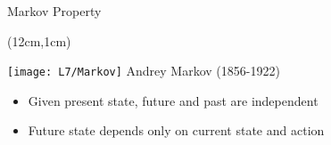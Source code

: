 \documentclass[11pt,aspectratio=169]{beamer}
\begin{document}
  
  \begin{frame}{Markov Property}
   \begin{textblock*}{3cm}(12cm,1cm)
    \begin{center}\tiny
     \texttt{[image: L7/Markov]}
     \vspace{5pt}
     Andrey Markov (1856-1922)
    \end{center}
   \end{textblock*}
   \vspace{40pt}
   \begin{itemize}
   \setlength{\itemsep}{2em}
    \item<+-> Given present state, future and past are independent
    \item<+-> Future state depends only on current state and action
    \vspace{10pt}
   \end{itemize}
  \end{frame}
  
\end{document}
